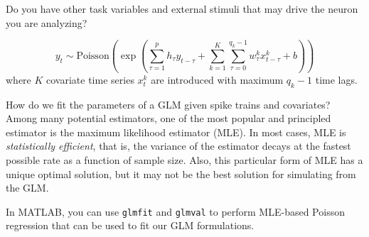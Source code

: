 \documentclass[a4paper,11pt]{exam}
\newif\ifMATLAB %
\newcommand{\funfact}{\textbf{Fun Fact:}~}
\begin{document}
\begin{questions}

\newpage
Do you have other task variables and external stimuli that may drive the neuron you are analyzing\cite{Park2014d}?
\begin{tcolorbox}[colback=red!5!white,colframe=red!50!black,title=GLM with covariates]
\begin{equation}\label{eq:GLM2}
    y_t \sim \text{Poisson}\left(\exp\left( \sum_{\tau=1}^p h_\tau y_{t-\tau} + \sum_{k=1}^K \sum_{\tau=0}^{q_k-1} w^k_\tau x^k_{t-\tau} + b\right)\right)
\end{equation}
where $K$ covariate time series $x^k_t$ are introduced with maximum $q_k-1$ time lags.
\end{tcolorbox}
How do we fit the parameters of a GLM given spike trains and covariates?
Among many potential estimators, one of the most popular and principled estimator is the maximum likelihood estimator (MLE).
In most cases, MLE is \emph{statistically efficient}, that is, the variance of the estimator decays at the fastest possible rate as a function of sample size.
Also, this particular form of MLE has a unique optimal solution, but it may not be the best solution for simulating from the GLM\cite{Arribas2020a}.

\ifMATLAB
In MATLAB, you can use \texttt{glmfit} and \texttt{glmval} to perform MLE-based Poisson regression that can be used to fit our GLM formulations.


\end{questions}
\end{document}
